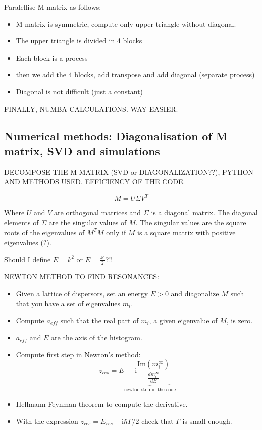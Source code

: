 Paralellise M matrix as follows:

\begin{itemize}
    \item M matrix is symmetric, compute only upper triangle without diagonal.
    \item The upper triangle is divided in 4 blocks
    \item Each block is a process
    \item then we add the 4 blocks, add transpose and add diagonal (separate process)
    \item Diagonal is not difficult (just a constant)
\end{itemize}

FINALLY, NUMBA CALCULATIONS. WAY EASIER.

\subsection{Numerical methods: Diagonalisation of M matrix, SVD and simulations}

DECOMPOSE THE M MATRIX (SVD or DIAGONALIZATION??), PYTHON AND METHODS USED. EFFICIENCY OF THE CODE.

\begin{equation}
    M  = U \Sigma V^T
\end{equation}

Where $U$ and $V$ are orthogonal matrices and $\Sigma$ is a diagonal matrix. The diagonal elements of $\Sigma$ are the singular values of $M$. The singular values are the square roots of the eigenvalues of $M^T M$ only if $M$ is a square matrix with positive eigenvalues (?).

Should I define $E=k^2$ or $E=\frac{k^2}{2}$?!!

NEWTON METHOD TO FIND RESONANCES:

\begin{itemize}
    \item Given a lattice of dispersors, set an energy $E>0$ and diagonalize $M$ such that you have a set of eigenvalues $m_i$.
    \item Compute $a_{eff}$ such that the real part of $m_i$, a given eigenvalue of $M$, is zero.
    \item $a_{eff}$ and $E$ are the axis of the histogram.
    \item Compute first step in Newton's method:
    \begin{equation}
        z_{res}=E \underbrace{-\text{i}\frac{\text{Im}(m^{\infty}_i)}{\frac{d m_i^{\infty}}{dE}}}_{\text{newton\_step in the code}}
    \end{equation}
    \item Hellmann-Feynman theorem to compute the derivative.
    \item With the expression $z_{res}=E_{res}-\text{i}\hbar \Gamma/2$ check that $\Gamma$ is small enough.
\end{itemize}